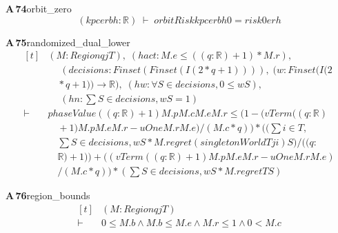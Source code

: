 \documentclass[conference]{IEEEtran}
\theoremstyle{definition}
\newcommand{\lean}[1]{\textsf{\footnotesize #1}}
\begin{document}
\noindent\textbf{A\,74}\quad\lean{orbit\_zero}
{\footnotesize\[ (\mathit{k} \mathit{p} \mathit{c} \mathit{e} \mathit{r} \mathit{b} \mathit{h} : \mathbb{R} ) \;\vdash\; \mathit{orbitRisk} \mathit{k} \mathit{p} \mathit{c} \mathit{e} \mathit{r} \mathit{b} \mathit{h} 0=\mathit{risk0} \mathit{e} \mathit{r} \mathit{h} \]}

\noindent\textbf{A\,75}\quad\lean{randomized\_dual\_lower}
{\footnotesize\[ \begin{aligned}[t]
&(\mathit{M} : \mathit{Region} \mathit{q} \mathit{j} \mathit{T}),\; (\mathit{hact} : \mathit{M}.\mathit{e} \leq ((\mathit{q}:\mathbb{R} )+1)*\mathit{M}.\mathit{r}),\\
&\quad \; (\mathit{decisions} : \mathit{Finset} (\mathit{Finset} (\mathit{I} (2*\mathit{q}+1)))),\; (\mathit{w} : \mathit{Finset} (\mathit{I} (2\\
&\quad *\mathit{q}+1)) \to \mathbb{R} ),\; (\mathit{hw} : \forall \mathit{S} \in \mathit{decisions},0 \leq \mathit{w} \mathit{S}),\\
&\quad \; (\mathit{hn} : \textstyle\sum \mathit{S} \in \mathit{decisions},\mathit{w} \mathit{S}=1)\\
\vdash\;&\mathit{phaseValue} ((\mathit{q}:\mathbb{R} )+1) \mathit{M}.\mathit{p} \mathit{M}.\mathit{c} \mathit{M}.\mathit{e} \mathit{M}.\mathit{r} \leq (1-(\mathit{vTerm} ((\mathit{q}:\mathbb{R} )\\
&\quad +1) \mathit{M}.\mathit{p} \mathit{M}.\mathit{e} \mathit{M}.\mathit{r}-\mathit{uOne} \mathit{M}.\mathit{r} \mathit{M}.\mathit{e})/(\mathit{M}.\mathit{c}*\mathit{q}))* ((\textstyle\sum \mathit{i} \in \mathit{T},\\
&\quad \textstyle\sum \mathit{S} \in \mathit{decisions},\mathit{w} \mathit{S}*\mathit{M}.\mathit{regret} (\mathit{singletonWorld} \mathit{T} \mathit{j} \mathit{i}) \mathit{S})/((\mathit{q}:\\
&\quad \mathbb{R} )+1))+ ((\mathit{vTerm} ((\mathit{q}:\mathbb{R} )+1) \mathit{M}.\mathit{p} \mathit{M}.\mathit{e} \mathit{M}.\mathit{r}-\mathit{uOne} \mathit{M}.\mathit{r} \mathit{M}.\mathit{e})\\
&\quad /(\mathit{M}.\mathit{c}*\mathit{q}))* (\textstyle\sum \mathit{S} \in \mathit{decisions},\mathit{w} \mathit{S}*\mathit{M}.\mathit{regret} \mathit{T} \mathit{S})
\end{aligned} \]}

\noindent\textbf{A\,76}\quad\lean{region\_bounds}
{\footnotesize\[ \begin{aligned}[t]
&(\mathit{M} : \mathit{Region} \mathit{q} \mathit{j} \mathit{T})\\
\vdash\;&0 \leq \mathit{M}.\mathit{b} \wedge \mathit{M}.\mathit{b} \leq \mathit{M}.\mathit{e} \wedge \mathit{M}.\mathit{r} \leq 1 \wedge 0 < \mathit{M}.\mathit{c}
\end{aligned} \]}
\end{document}

